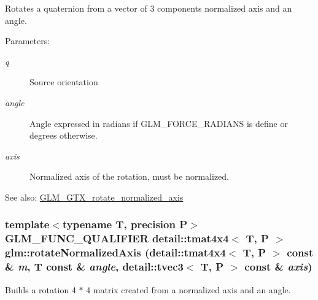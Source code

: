 Rotates a quaternion from a vector of 3 components normalized axis and an angle.

\begin{Desc}
\item[Parameters:]
\begin{description}
\item[{\em q}]Source orientation \item[{\em angle}]Angle expressed in radians if GLM\_\-FORCE\_\-RADIANS is define or degrees otherwise. \item[{\em axis}]Normalized axis of the rotation, must be normalized.\end{description}
\end{Desc}
\begin{Desc}
\item[See also:]\hyperlink{group__gtx__rotate__normalized__axis}{GLM\_\-GTX\_\-rotate\_\-normalized\_\-axis} \end{Desc}
\hypertarget{group__gtx__rotate__normalized__axis_g9fc93bb16dd6719fc660a506cb833fb0}{
\subsubsection[rotateNormalizedAxis]{\setlength{\rightskip}{0pt plus 5cm}template$<$typename T, precision P$>$ GLM\_\-FUNC\_\-QUALIFIER detail::tmat4x4$<$ T, P $>$ glm::rotateNormalizedAxis (detail::tmat4x4$<$ T, P $>$ const \& {\em m}, \/  T const \& {\em angle}, \/  detail::tvec3$<$ T, P $>$ const \& {\em axis})}}
\label{group__gtx__rotate__normalized__axis_g9fc93bb16dd6719fc660a506cb833fb0}


Builds a rotation 4 $\ast$ 4 matrix created from a normalized axis and an angle.

